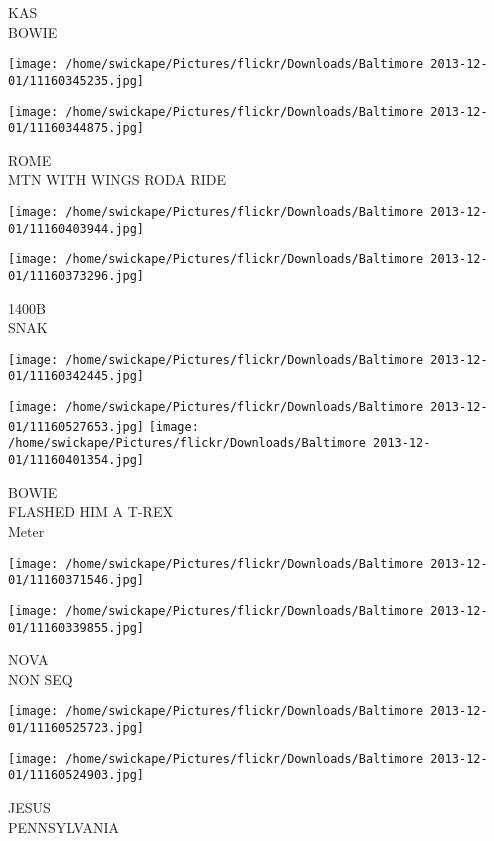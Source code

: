\documentclass[10pt,letterpaper]{article}
\begin{document}
KAS\\
BOWIE
\pagebreak

\texttt{[image: /home/swickape/Pictures/flickr/Downloads/Baltimore 2013-12-01/11160345235.jpg]}

\vspace{0.25in}
\texttt{[image: /home/swickape/Pictures/flickr/Downloads/Baltimore 2013-12-01/11160344875.jpg]}

ROME\\
MTN WITH WINGS RODA RIDE
\pagebreak

\texttt{[image: /home/swickape/Pictures/flickr/Downloads/Baltimore 2013-12-01/11160403944.jpg]}

\vspace{0.25in}
\texttt{[image: /home/swickape/Pictures/flickr/Downloads/Baltimore 2013-12-01/11160373296.jpg]}

1400B\\
SNAK
\pagebreak

\texttt{[image: /home/swickape/Pictures/flickr/Downloads/Baltimore 2013-12-01/11160342445.jpg]}

\vspace{0.25in}
\texttt{[image: /home/swickape/Pictures/flickr/Downloads/Baltimore 2013-12-01/11160527653.jpg]}
\texttt{[image: /home/swickape/Pictures/flickr/Downloads/Baltimore 2013-12-01/11160401354.jpg]}

BOWIE\\
FLASHED HIM A T{-}REX\\
Meter
\pagebreak

\texttt{[image: /home/swickape/Pictures/flickr/Downloads/Baltimore 2013-12-01/11160371546.jpg]}

\vspace{0.25in}
\texttt{[image: /home/swickape/Pictures/flickr/Downloads/Baltimore 2013-12-01/11160339855.jpg]}

NOVA\\
NON SEQ
\pagebreak

\texttt{[image: /home/swickape/Pictures/flickr/Downloads/Baltimore 2013-12-01/11160525723.jpg]}

\vspace{0.25in}
\texttt{[image: /home/swickape/Pictures/flickr/Downloads/Baltimore 2013-12-01/11160524903.jpg]}

JESUS\\
PENNSYLVANIA
\pagebreak
\end{document}
